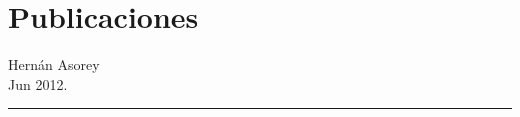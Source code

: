 \documentclass[11pt, a4paper]{article}
\newif\ifeng
\begin{document}






\ifeng
\section*{Publications}
\else
\section*{Publicaciones}
\fi

















\vspace{2cm}
\begin{flushright}
Hernán Asorey\\
Jun 2012.
\end{flushright}
\hrule
\end{document}
